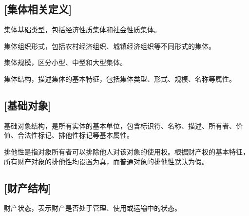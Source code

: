 \subsection{[集体相关定义]}

\begin{definition}\label{CollectiveBaseType}
\leanok
{}
\uses{}
集体基础类型，包括经济性质集体和社会性质集体。
\end{definition}

\begin{definition}\label{CollectiveForm}
\leanok
{}
\uses{}
集体组织形式，包括农村经济组织、城镇经济组织等不同形式的集体。
\end{definition}

\begin{definition}\label{CollectiveScale}
\leanok
{}
\uses{}
集体规模，区分小型、中型和大型集体。
\end{definition}

\begin{definition}\label{Collective}
\leanok
{}
集体结构，描述集体的基本特征，包括集体类型、形式、规模、名称等属性。
\end{definition}

\subsection{[基础对象]}

\begin{definition}\label{Object}
\leanok
{}
基础对象结构，是所有实体的基本单位，包含标识符、名称、描述、所有者、价值、合法性标记、排他性标记等基本属性。
\end{definition}

\begin{definition}\label{isExclusive}
\leanok
{}
排他性是指对象所有者可以排除他人对该对象的使用权。根据财产权的基本特征，所有财产对象的排他性均设置为真，而普通对象的排他性默认为假。
\end{definition}

\subsection{[财产结构]}

\begin{definition}\label{PropertyState}
\leanok
{}
\uses{}
财产状态，表示财产是否处于管理、使用或运输中的状态。
\end{definition}

